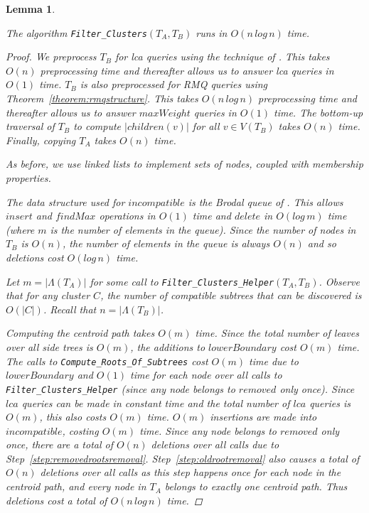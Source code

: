 \documentclass{article}
\newcommand{\leafset}{\Lambda}
\newtheorem{filterclustersruntime}[incompatibility]{Lemma}
\begin{document}
    \bigskip
    \begin{filterclustersruntime}
        \label{lem:filterclustersruntime}

        The algorithm \texttt{Filter\_Clusters}$(T_A, T_B)$ runs in $O(n\,log\,n)$ time.

        \begin{proof}
            We preprocess $T_B$ for \textit{lca} queries using the technique of \cite{bender2000lca}. This takes $O(n)$ preprocessing time and thereafter allows us to answer \textit{lca} queries in $O(1)$ time. $T_B$ is also preprocessed for RMQ queries using Theorem~\ref{theorem:rmqstructure}. This takes $O(n\,log\,n)$ preprocessing time and thereafter allows us to answer $maxWeight$ queries in $O(1)$ time. The bottom-up traversal of $T_B$ to compute $|children(v)|$ for all $v \in V(T_B)$ takes $O(n)$ time. Finally, copying $T_A$ takes $O(n)$ time.

            As before, we use linked lists to implement sets of nodes, coupled with membership properties.

            The data structure used for $incompatible$ is the Brodal queue of \cite{brodal1995fast}. This allows $insert$ and $findMax$ operations in $O(1)$ time and $delete$ in $O(log\,m)$ time (where $m$ is the number of elements in the queue). Since the number of nodes in $T_B$ is $O(n)$, the number of elements in the queue is always $O(n)$ and so deletions cost $O(log\,n)$ time.

            Let $m = |\leafset(T_A)|$ for some call to \texttt{Filter\_Clusters\_Helper}$(T_A, T_B)$. Observe that for any cluster $C$, the number of compatible subtrees that can be discovered is $O(|C|)$. Recall that $n = |\leafset(T_B)|$.

            Computing the centroid path takes $O(m)$ time. Since the total number of leaves over all side trees is $O(m)$, the additions to $lowerBoundary$ cost $O(m)$ time. The calls to \texttt{Compute\_Roots\_Of\_Subtrees} cost $O(m)$ time due to $lowerBoundary$ and $O(1)$ time for each node over all calls to \texttt{Filter\_Clusters\_Helper} (since any node belongs to $removed$ only once). Since $lca$ queries can be made in constant time and the total number of $lca$ queries is $O(m)$, this also costs $O(m)$ time. $O(m)$ insertions are made into $incompatible$, costing $O(m)$ time. Since any node belongs to $removed$ only once, there are a total of $O(n)$ deletions over all calls due to Step~\ref{step:removedrootsremoval}. Step~\ref{step:oldrootremoval} also causes a total of $O(n)$ deletions over all calls as this step happens once for each node in the centroid path, and every node in $T_A$ belongs to exactly one centroid path. Thus deletions cost a total of $O(n\,log\,n)$ time.


\end{proof}
\end{filterclustersruntime}
\end{document}
